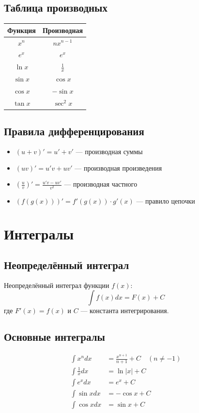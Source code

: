 \documentclass[12pt,a4paper]{report}
\begin{document}
\section{Таблица производных}
\begin{center}
\begin{tabular}{|c|c|}
\hline
\textbf{Функция} & \textbf{Производная} \\
\hline
$x^n$ & $nx^{n-1}$ \\
$e^x$ & $e^x$ \\
$\ln x$ & $\frac{1}{x}$ \\
$\sin x$ & $\cos x$ \\
$\cos x$ & $-\sin x$ \\
$\tan x$ & $\sec^2 x$ \\
\hline
\end{tabular}
\end{center}

\section{Правила дифференцирования}
\begin{itemize}
    \item $(u + v)' = u' + v'$ — производная суммы
    \item $(uv)' = u'v + uv'$ — производная произведения
    \item $\left(\frac{u}{v}\right)' = \frac{u'v - uv'}{v^2}$ — производная частного
    \item $(f(g(x)))' = f'(g(x)) \cdot g'(x)$ — правило цепочки
\end{itemize}

\chapter{Интегралы}

\section{Неопределённый интеграл}
Неопределённый интеграл функции $f(x)$:
\begin{equation}
\int f(x) dx = F(x) + C
\end{equation}
где $F'(x) = f(x)$ и $C$ — константа интегрирования.

\section{Основные интегралы}
\begin{align}
\int x^n dx &= \frac{x^{n+1}}{n+1} + C \quad (n \neq -1) \\
\int \frac{1}{x} dx &= \ln|x| + C \\
\int e^x dx &= e^x + C \\
\int \sin x dx &= -\cos x + C \\
\int \cos x dx &= \sin x + C
\end{align}
\end{document}

